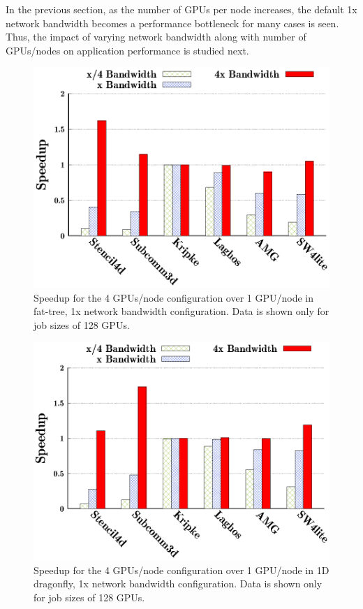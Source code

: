 In the previous section, as the number of GPUs per node increases, 
the default 1x network bandwidth becomes a performance bottleneck for many
cases is seen.  Thus, the impact of varying network bandwidth along with number of
GPUs/nodes on application performance is studied next. 

\begin{figure}[t]
\centering
    \includegraphics[width=0.8\columnwidth]{figure/plots/bw/ftree-bw-mapping-all.eps}
  \caption{Speedup for the 4 GPUs/node configuration over 1 GPU/node in fat-tree, 1x network
  bandwidth configuration. Data is shown only for job sizes of 128 GPUs.}
  \label{fig:bw_ftree}
\end{figure}

\begin{figure}[t]
\centering
    \includegraphics[width=0.8\columnwidth]{figure/plots/bw/dfly-bw-mapping-all.eps}
  \caption{Speedup for the 4 GPUs/node configuration over 1 GPU/node in 1D dragonfly, 1x network
  bandwidth configuration. Data is shown only for job sizes of 128 GPUs.}
  \label{fig:bw_dfly}
\end{figure}


